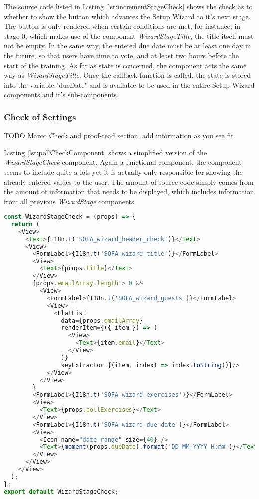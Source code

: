 The source code listed in Listing \ref{lst:incrementStageCheck} shows the check as to whether to show the button which advances the Setup Wizard to it's next stage. The button is only rendered when certain conditions are met, for instance, in stage 0, which makes use of the component \textit{WizardStageTitle}, the title itself must not be empty. In the same way, the entered due date must be at least one day in the future, so that users have time to vote, and at least two hours before the start of the training.
\newline
As far as state is concerned, the component acts the same way as \textit{WizardStageTitle}. Once the callback function is called, the state is stored into the variable "dueDate" and is available to be used in the entire Setup Wizard components and it's sub-components.

\subsubsection{Check of Settings}
\label{sssec:poll_check}

TODO Marco Check and proof-read section, add information as you see fit 

Listing \ref{lst:pollCheckComponent} shows a simplified version of the \textit{WizardStageCheck} component. Again a functional component, the component seems to include quite a lot, yet it is actually only responsible for showing the already entered values to the user. The amount of source code simply comes from the amount of information that needs to be displayed, which includes information from all previous \textit{WizardStage} components.

\begin{lstlisting}[language=javascript,caption=Simplified Poll Check Component,label=lst:pollCheckComponent]
const WizardStageCheck = (props) => {
  return (
    <View>
      <Text>{I18n.t('SOFA_wizard_header_check')}</Text>
      <View>
        <FormLabel>{I18n.t('SOFA_wizard_title')}</FormLabel>
        <View>
          <Text>{props.title}</Text>
        </View>
        {props.emailArray.length > 0 &&
          <View>
            <FormLabel>{I18n.t('SOFA_wizard_guests')}</FormLabel>
            <View>
              <FlatList
                data={props.emailArray}
                renderItem={({ item }) => (
                  <View>
                    <Text>{item.email}</Text>
                  </View>
                )}
                keyExtractor={(item, index) => index.toString()}/>
            </View>
          </View>
        }
        <FormLabel>{I18n.t('SOFA_wizard_exercises')}</FormLabel>
        <View>
          <Text>{props.pollExercises}</Text>
        </View>
        <FormLabel>{I18n.t('SOFA_wizard_due_date')}</FormLabel>
        <View>
          <Icon name="date-range" size={40} />
          <Text>{moment(props.dueDate).format('DD-MM-YYYY H:mm')}</Text>
        </View>
      </View>
    </View>
  );
};
export default WizardStageCheck;
\end{lstlisting}

